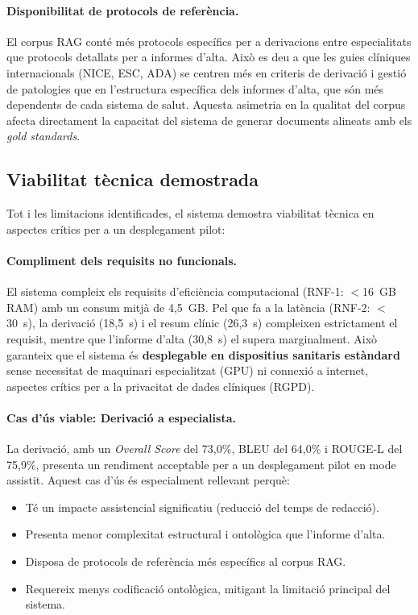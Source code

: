 \documentclass[CAT]{TFUOC}%
\begin{document}
\paragraph{Disponibilitat de protocols de referència.}
El corpus RAG conté més protocols específics per a derivacions entre especialitats que protocols detallats per a informes d'alta. Això es deu a que les guies clíniques internacionals (NICE, ESC, ADA) se centren més en criteris de derivació i gestió de patologies que en l'estructura específica dels informes d'alta, que són més dependents de cada sistema de salut. Aquesta asimetria en la qualitat del corpus afecta directament la capacitat del sistema de generar documents alineats amb els \textit{gold standards}.

\subsection{Viabilitat tècnica demostrada}

Tot i les limitacions identificades, el sistema demostra viabilitat tècnica en aspectes crítics per a un desplegament pilot:

\paragraph{Compliment dels requisits no funcionals.}
El sistema compleix els requisits d'eficiència computacional (RNF-1: $<$16~GB RAM) amb un consum mitjà de 4,5~GB. Pel que fa a la latència (RNF-2: $<$30~s), la derivació (18,5~s) i el resum clínic (26,3~s) compleixen estrictament el requisit, mentre que l'informe d'alta (30,8~s) el supera marginalment. Això garanteix que el sistema és \textbf{desplegable en dispositius sanitaris estàndard} sense necessitat de maquinari especialitzat (GPU) ni connexió a internet, aspectes crítics per a la privacitat de dades clíniques (RGPD).

\paragraph{Cas d'ús viable: Derivació a especialista.}
La derivació, amb un \textit{Overall Score} del 73,0\%, BLEU del 64,0\% i ROUGE-L del 75,9\%, presenta un rendiment acceptable per a un desplegament pilot en mode assistit. Aquest cas d'ús és especialment rellevant perquè:
\begin{itemize}
    \item Té un impacte assistencial significatiu (reducció del temps de redacció).
    \item Presenta menor complexitat estructural i ontològica que l'informe d'alta.
    \item Disposa de protocols de referència més específics al corpus RAG.
    \item Requereix menys codificació ontològica, mitigant la limitació principal del sistema.
\end{itemize}
\end{document}
